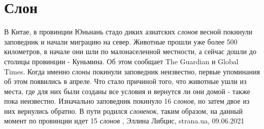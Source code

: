  
 
 
 
 
\chapter{Слон}

В Китае, в провинции Юньнань стадо диких азиатских \emph{слонов} весной покинули
заповедник и начали миграцию на север. Животные прошли уже более 500
километров, в начале они шли по малонаселенной местности, а сейчас дошли до
столицы провинции - Куньмина.  Об этом сообщает The Guardian и Global Times.
Когда именно \emph{слоны} покинули заповедник неизвестно, первые упоминания об этом
появились в апреле. Что стало причиной того, что животные ушли из места, где
для них были созданы все условия и вернутся ли они домой - также пока
неизвестно. Изначально заповедник покинуло 16 \emph{слонов}, но затем двое из них
вернулись обратно. В пути родился \emph{слоненок}, таким образом, на данный момент по
провинции идет 15 \emph{слонов}
, Эллина Либцис, strana.ua, 09.06.2021

